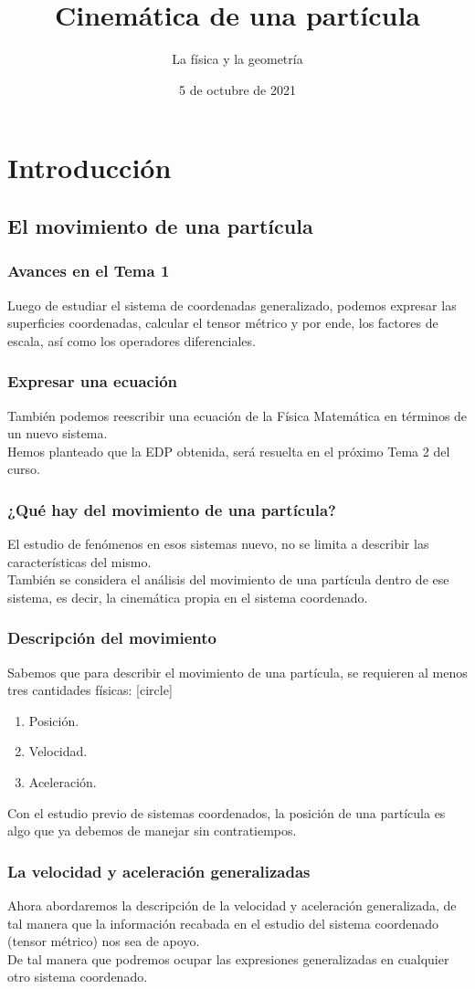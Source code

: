 \documentclass[12pt]{beamer}
\date{5 de octubre de 2021}
\title{Cinemática de una partícula}
\subtitle{La física y la geometría}
\begin{document}
\maketitle
\fontsize{14}{14}\selectfont
{}

\section{Introducción}
\subsection{El movimiento de una partícula}

\begin{frame}
\frametitle{Avances en el Tema 1}
Luego de estudiar el sistema de coordenadas generalizado, podemos expresar las superficies coordenadas, calcular el tensor métrico y por ende, los factores de escala, así como los operadores diferenciales.
\end{frame}
\begin{frame}
\frametitle{Expresar una ecuación}
También podemos reescribir una ecuación de la Física Matemática en términos de un nuevo sistema.
\\
\bigskip
\pause
Hemos planteado que la EDP obtenida, será resuelta en el próximo Tema 2 del curso.
\end{frame}
\begin{frame}
\frametitle{¿Qué hay del movimiento de una partícula?}
El estudio de fenómenos en esos sistemas nuevo, no se limita a describir las características del mismo.
\\
\bigskip
\pause
También se considera el análisis del movimiento de una partícula dentro de ese sistema, es decir, la cinemática propia en el sistema coordenado.
\end{frame}
\begin{frame}
\frametitle{Descripción del movimiento}
Sabemos que para describir el movimiento de una partícula, se requieren al menos tres cantidades físicas:
\pause
{}
[circle]
\begin{enumerate}[<+->]
\item Posición.
\item Velocidad.
\item Aceleración.
\end{enumerate}
\pause
Con el estudio previo de sistemas coordenados, la posición de una partícula es algo que ya debemos de manejar sin contratiempos.
\end{frame}
\begin{frame}
\frametitle{La velocidad y aceleración generalizadas}
Ahora abordaremos la descripción de la velocidad y aceleración generalizada, de tal manera que la información recabada en el estudio del sistema coordenado (tensor métrico) nos sea de apoyo.
\\
\bigskip
\pause
De tal manera que podremos ocupar las expresiones generalizadas en cualquier otro sistema coordenado.
\end{frame}
\end{document}
